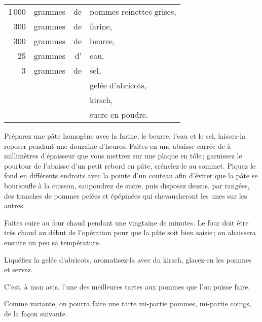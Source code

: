 \footnotesize
\begin{longtable}{rrrp{16em}}
  1 000 & grammes & de & pommes reinettes grises,                                                         \\
    300 & grammes & de & farine,                                                                          \\
    300 & grammes & de & beurre,                                                                          \\
     25 & grammes & d' & eau,                                                                             \\
      3 & grammes & de & sel,                                                                             \\
        &         &    & gelée d'abricots,                                                                \\
        &         &    & kirsch,                                                                          \\
        &         &    & sucre en poudre.                                                                 \\
\end{longtable}
\normalsize

Préparez une pâte homogène avec la farine, le beurre, l'eau et le sel,
laissez-la reposer pendant une douzaine d'heures. Faites-en une abaisse carrée
de {\mmm} à {\mmm} millimètres d'épaisseur que vous mettrez sur une
plaque en tôle ; garnissez le pourtour de l'abaisse d’un petit rebord en pâte,
crénelez-le au sommet. Piquez le fond en différents endroits avec la pointe
d'un couteau afin d'éviter que la pâte se boursoufle à la cuisson, saupoudrez
de sucre, puis disposez dessus, par rangées, des tranches de pommes pelées et
épépinées qui chevaucheront les unes sur les autres.

Faites cuire au four chaud pendant une vingtaine de minutes. Le four doit être
très chaud au début de l'opération pour que la pâte soit bien saisie ; on
abaissera ensuite un peu sa température.

Liquéfiez la gelée d'abricots, aromatisez-la avec du kirsch, glacez-en les pommes
et servez.

C'est, à mon avis, l’une des meilleures tartes aux pommes que l'on puisse faire.

\sk

Comme variante, on pourra faire une tarte mi-partie pommes, mi-partie coings,
de la façon suivante.

